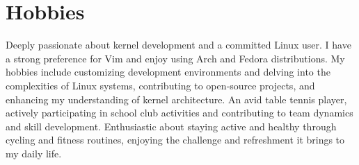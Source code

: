 \section{Hobbies}
  \resumeSubHeadingListStart
      {Deeply passionate about kernel development and a committed Linux user. I have a strong preference for Vim and enjoy using Arch and Fedora distributions. My hobbies include customizing development environments and delving into the complexities of Linux systems, contributing to open‑source projects, and enhancing my understanding of kernel architecture.}
      {An avid table tennis player, actively participating in school club activities and contributing to team dynamics and skill development.}
      {Enthusiastic about staying active and healthy through cycling and fitness routines, enjoying the challenge and refreshment it brings to my daily life.}
  \resumeSubHeadingListEnd